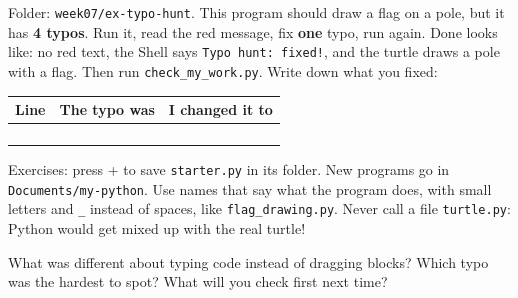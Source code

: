 \begin{exercise}
Folder: \texttt{week07/ex-typo-hunt}. This program should draw a flag on a pole, but it has \textbf{4 typos}. Run it, read the red message, fix \textbf{one} typo, run again. Done looks like: no red text, the Shell says \texttt{Typo hunt: fixed!}, and the turtle draws a pole with a flag. Then run \texttt{check\_my\_work.py}. Write down what you fixed:
\begin{center}
\renewcommand{\arraystretch}{1.6}
\begin{tabular}{@{}p{2cm}p{5cm}p{5cm}@{}}
\toprule
Line & The typo was & I changed it to\\
\midrule
 & & \\ \midrule
 & & \\ \midrule
 & & \\ \midrule
 & & \\
\bottomrule
\end{tabular}
\end{center}
\end{exercise}

\begin{tip}
Exercises: press + to save \texttt{starter.py} in its folder. New programs go in \texttt{Documents/my-python}. Use names that say what the program does, with small letters and \texttt{\_} instead of spaces, like \texttt{flag\_drawing.py}. Never call a file \texttt{turtle.py}: Python would get mixed up with the real turtle!
\end{tip}

\begin{vocab}
\end{vocab}

\begin{reflection}
What was different about typing code instead of dragging blocks?
Which typo was the hardest to spot? What will you check first next time?
\end{reflection}
